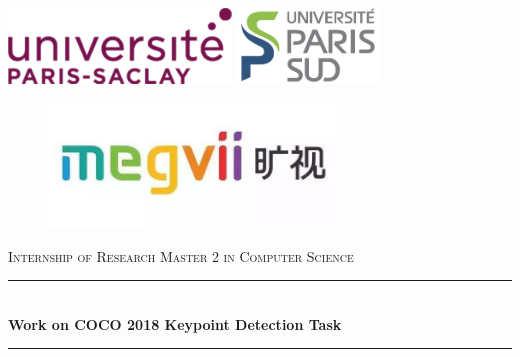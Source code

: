 \documentclass[oneside]{memoir}
\newcommand{\HRule}{\rule{\linewidth}{0.5mm}}
\begin{document}
\begin{titlingpage}

\begin{center}

%
\includegraphics[height=2cm]{logos/upsay.pdf} \hfill %
\includegraphics[height=2cm]{logos/ups.png} %
\\[1.5cm]




\begin{figure}[htbp]
  \centering
  \includegraphics[width=3in]{logos/face++.jpeg}
\end{figure}


\vspace{2cm}
\textsc{\Large Internship of Research Master 2 in Computer Science}\\[0.5cm]


\HRule \\[0.4cm]
{ \huge \bfseries Work on COCO 2018 Keypoint Detection Task}\\[0.4cm]

\HRule \\[1.5cm]


\end{center}
\end{titlingpage}
\end{document}
